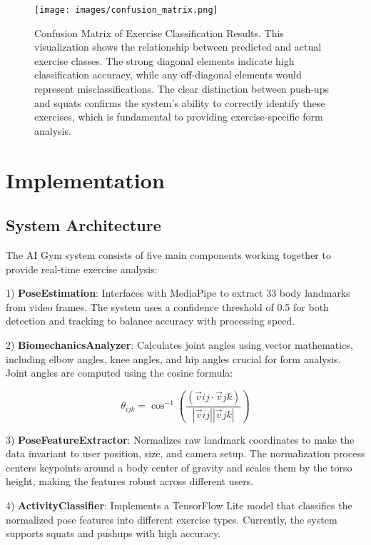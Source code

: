 \documentclass[11pt]{article}
\begin{document}
\begin{figure}[htbp]
    \centering
    \texttt{[image: images/confusion\_matrix.png]}
    \caption{Confusion Matrix of Exercise Classification Results. This visualization shows the relationship between predicted and actual exercise classes. The strong diagonal elements indicate high classification accuracy, while any off-diagonal elements would represent misclassifications. The clear distinction between push-ups and squats confirms the system's ability to correctly identify these exercises, which is fundamental to providing exercise-specific form analysis.}
    \label{fig:confusion_matrix}
\end{figure}

\section{Implementation}

\subsection{System Architecture}
The AI Gym system consists of five main components working together to provide real-time exercise analysis:

1) \textbf{PoseEstimation}: Interfaces with MediaPipe to extract 33 body landmarks from video frames. The system uses a confidence threshold of 0.5 for both detection and tracking to balance accuracy with processing speed.

2) \textbf{BiomechanicsAnalyzer}: Calculates joint angles using vector mathematics, including elbow angles, knee angles, and hip angles crucial for form analysis. Joint angles are computed using the cosine formula:

\begin{equation}
\theta_{ijk} = \cos^{-1}\left(\frac{(\vec{v}{ij} \cdot \vec{v}{jk})}{|\vec{v}{ij}||\vec{v}{jk}|}\right)
\end{equation}

3) \textbf{PoseFeatureExtractor}: Normalizes raw landmark coordinates to make the data invariant to user position, size, and camera setup. The normalization process centers keypoints around a body center of gravity and scales them by the torso height, making the features robust across different users.

4) \textbf{ActivityClassifier}: Implements a TensorFlow Lite model that classifies the normalized pose features into different exercise types. Currently, the system supports squats and pushups with high accuracy.
\end{document}
